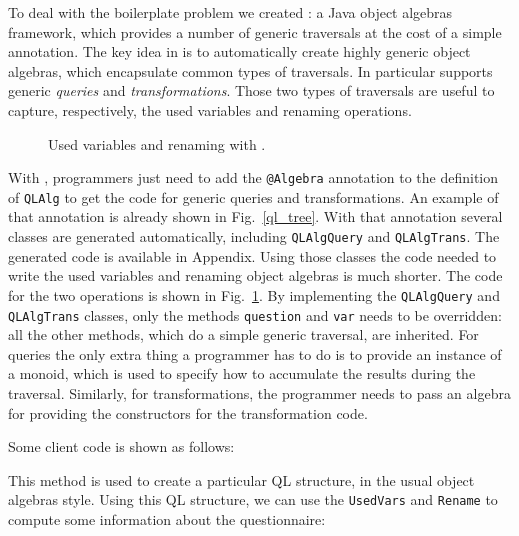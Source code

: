 To deal with the boilerplate problem we created \Name: a Java object
algebras framework, which provides a number of generic traversals at
the cost of a simple annotation. The key idea in \name is to
automatically create highly generic object algebras, which encapsulate
common types of traversals. In particular \name supports generic
\emph{queries} and \emph{transformations}. Those two types of
traversals are useful to capture, respectively, the used variables and
renaming operations.

\begin{figure}[t]
\nocaptionrule
\vspace{-.1in}
\caption{Used variables and renaming with \Name.}
\label{ql_with_oaframework}
\end{figure}

With \Name, programmers just need to add the \lstinline{@Algebra} annotation
to the definition of \lstinline{QLAlg} to get the code for generic
queries and transformations. An example of that annotation is already
shown in Fig.~\ref{ql_tree}. With that annotation several classes
are generated automatically, including \lstinline{QLAlgQuery} and
\lstinline{QLAlgTrans}. The generated code is available in Appendix. Using those classes the code needed to write
the used variables and renaming object algebras is much
shorter. The code for the two operations is shown in
Fig.~\ref{ql_with_oaframework}. By implementing the
\lstinline{QLAlgQuery} and \lstinline{QLAlgTrans} classes, only the methods
\lstinline{question} and \lstinline{var} needs to be overridden: all the other methods,
which do a simple generic traversal, are inherited. For queries the
only extra thing a programmer has to do is to provide an instance of a
monoid, which is used to specify how to accumulate the results during
the traversal. Similarly, for transformations, the programmer needs to
pass an algebra for providing the constructors for the transformation
code.

Some client code is shown as follows: %


This method is used to create a particular QL structure, in the
usual object algebras style.
Using this QL structure, we can use the \lstinline{UsedVars}
and \lstinline{Rename} to compute some information about the questionnaire:

